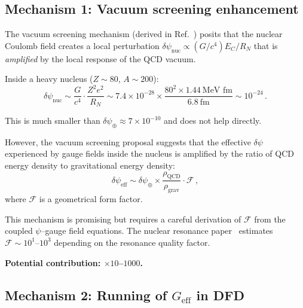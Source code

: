 \documentclass[aps,prd,twocolumn,superscriptaddress,floatfix,nofootinbib]{revtex4-2}
\newcommand{\dpsi}{\delta\psi}
\begin{document}
\subsection{Mechanism 1: Vacuum screening enhancement}
\label{sec:vac_screen}

The vacuum screening mechanism (derived in Ref.~\cite{VacScreen}) posits that
the nuclear Coulomb field creates a local perturbation
$\dpsi_{\mathrm{nuc}} \propto (G/c^4) E_C / R_N$ that is \emph{amplified}
by the local response of the QCD vacuum.

Inside a heavy nucleus ($Z \sim 80$, $A \sim 200$):
\begin{equation}
\dpsi_{\mathrm{nuc}} \sim \frac{G}{c^4} \cdot
\frac{Z^2 e^2}{R_N}
\sim 7.4 \times 10^{-28} \times \frac{80^2 \times 1.44~\text{MeV fm}}{6.8~\text{fm}}
\sim 10^{-24} \, .
\label{eq:dpsi_nuc}
\end{equation}

This is much smaller than $\dpsi_\oplus \approx 7 \times 10^{-10}$ and does
not help directly.

However, the vacuum screening proposal suggests that the effective
$\dpsi$ experienced by gauge fields inside the nucleus is amplified by the
ratio of QCD energy density to gravitational energy density:
\begin{equation}
\dpsi_{\mathrm{eff}} \sim \dpsi_\oplus \times
\frac{\rho_{\mathrm{QCD}}}{\rho_{\mathrm{grav}}} \cdot \mathcal{F} \, ,
\end{equation}
where $\mathcal{F}$ is a geometrical form factor.

This mechanism is promising but requires a careful derivation of $\mathcal{F}$
from the coupled $\psi$--gauge field equations. The nuclear resonance
paper~\cite{NucRes} estimates $\mathcal{F} \sim 10^{1}$--$10^{3}$ depending
on the resonance quality factor.

\textbf{Potential contribution: $\times 10$--$1000$.}

\subsection{Mechanism 2: Running of $G_{\mathrm{eff}}$ in DFD}
\label{sec:G_running}
\end{document}
